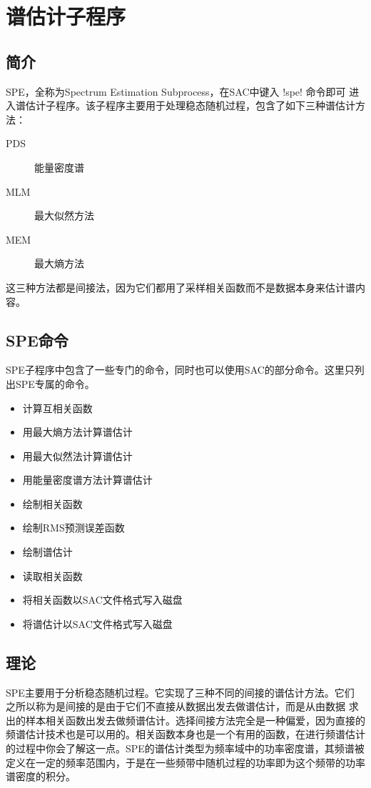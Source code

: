 \section{谱估计子程序}

\subsection{简介}
SPE，全称为Spectrum Estimation Subprocess，在SAC中键入 !spe! 命令即可
进入谱估计子程序。该子程序主要用于处理稳态随机过程，包含了如下三种谱估计方法：

\begin{description}
\item [PDS] 能量密度谱
\item [MLM] 最大似然方法
\item [MEM] 最大熵方法
\end{description}

这三种方法都是间接法，因为它们都用了采样相关函数而不是数据本身来估计谱内容。

\subsection{SPE命令}
SPE子程序中包含了一些专门的命令，同时也可以使用SAC的部分命令。这里只列出SPE专属的命令。
\begin{itemize}
\item {} 计算互相关函数
\item {} 用最大熵方法计算谱估计
\item {} 用最大似然法计算谱估计
\item {} 用能量密度谱方法计算谱估计
\item {} 绘制相关函数
\item {} 绘制RMS预测误差函数
\item {} 绘制谱估计
\item {} 读取相关函数
\item {} 将相关函数以SAC文件格式写入磁盘
\item {} 将谱估计以SAC文件格式写入磁盘
\end{itemize}

\subsection{理论}
SPE主要用于分析稳态随机过程。它实现了三种不同的间接的谱估计方法。它们
之所以称为是间接的是由于它们不直接从数据出发去做谱估计，而是从由数据
求出的样本相关函数出发去做频谱估计。选择间接方法完全是一种偏爱，因为直接的
频谱估计技术也是可以用的。相关函数本身也是一个有用的函数，在进行频谱估计
的过程中你会了解这一点。SPE的谱估计类型为频率域中的功率密度谱，其频谱被
定义在一定的频率范围内，于是在一些频带中随机过程的功率即为这个频带的功率
谱密度的积分。

